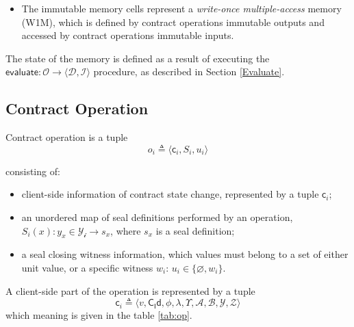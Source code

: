 \documentclass[9pt,oneside]{amsart}
\begin{document}
\begin{multicols}{2}
\begin{itemize}
\item The immutable memory cells represent a \emph{write-once multiple-access} memory (W1M),
  which is defined by contract operations immutable outputs
  and accessed by contract operations immutable inputs.
\end{itemize}

The state of the memory is defined as a result of executing the
$\mathsf{evaluate}: \mathcal{O} \rightarrow \langle \mathcal{D}, \mathcal{I} \rangle$ procedure,
as described in Section \ref{Evaluate}.

\subsection{Contract Operation}\label{Operation}

Contract operation is a tuple
\begin{equation}
o_i \triangleq \langle \mathsf{c}_i, S_i, u_i \rangle
\end{equation}

\columnbreak
\noindent
consisting of:
\noindent
\begin{itemize}
\item client-side information of contract state change, represented by a tuple $\mathsf{c}_i$;
\item an unordered map of seal definitions performed by an operation,
  $S_i(x): y_x \in \mathcal{Y_i} \rightarrow s_x$, where $s_x$ is a seal definition;
\item a seal closing witness information,
  which values must belong to a set of either unit value, or a specific witness $w_i$:
  $u_i \in \{ \varnothing, w_i \}$.
\end{itemize}

A client-side part of the operation is represented by a tuple
\noindent
\begin{equation}
\mathsf{c}_i \triangleq \langle v, \mathsf{C_Id}, \phi, \lambda, \Upsilon, \mathcal{A}, \mathcal{B}, \mathcal{Y}, \mathcal{Z} \rangle
\end{equation}
\noindent
which meaning is given in the table \ref{tab:op}.

\end{multicols}
\end{document}
